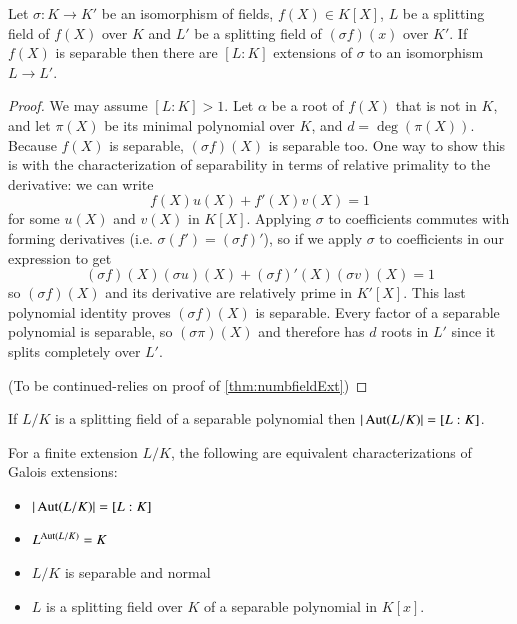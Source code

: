 \documentclass[12pt, a4paper, oneside, openright, titlepage]{book}
\begin{document}
\begin{thm}
    Let $\sigma:K\rightarrow K'$ be an isomorphism of fields, $f(X) \in K[X]$, $L$ be a splitting field of $f(X)$ over $K$ and $L'$ be a splitting field of $(\sigma f)(x)$ over $K'$. If $f(X)$ is separable then there are $[L:K]$ extensions of $\sigma$ to an isomorphism $L\rightarrow L'$.
\end{thm}
\begin{proof}
    We may assume $[L:K] > 1$. Let $\alpha$ be a root of $f(X)$ that is not in $K$, and let $\pi(X)$ be its minimal polynomial over $K$, and $d = \deg(\pi(X))$. Because $f(X)$ is separable, $(\sigma f)(X)$ is separable too. One way to show this is with the characterization of separability in terms of relative primality to the derivative: we can write \begin{equation*}
        f(X)u(X) + f'(X)v(X) = 1
    \end{equation*}
    for some $u(X)$ and $v(X)$ in $K[X]$. Applying $\sigma$ to coefficients commutes with forming derivatives (i.e. $\sigma(f') = (\sigma f)'$), so if we apply $\sigma$ to coefficients in our expression to get \begin{equation*}
        (\sigma f)(X)(\sigma u)(X)+(\sigma f)'(X)(\sigma v)(X) = 1
    \end{equation*}
    so $(\sigma f)(X)$ and its derivative are relatively prime in $K'[X]$. This last polynomial identity proves $(\sigma f)(X)$ is separable. Every factor of a separable polynomial is separable, so $(\sigma \pi)(X)$ and therefore has $d$ roots in $L'$ since it splits completely over $L'$.

    (To be continued-relies on proof of \ref{thm:numbfieldExt})
\end{proof}



\begin{cor}\label{cor:galsep}
    If $L/K$ is a splitting field of a separable polynomial then $|\operatorname{Aut}(L/K)| = [L:K]$.
\end{cor}


\begin{thm}
    For a finite extension $L/K$, the following are equivalent characterizations of Galois extensions: \begin{itemize}
        \item $|\operatorname{Aut}(L/K)| = [L:K]$
        \item $L^{\operatorname{Aut}(L/K)} = K$
        \item $L/K$ is separable and normal
        \item $L$ is a splitting field over $K$ of a separable polynomial in $K[x]$.
    \end{itemize}
\end{thm}
\end{document}
